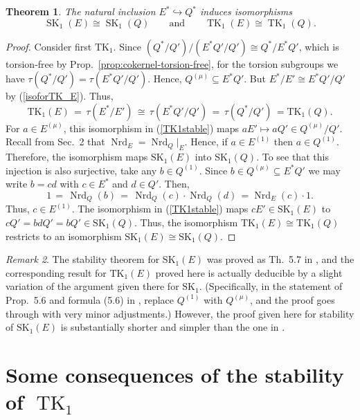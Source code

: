 \documentclass[11pt]{article}
\numberwithin{equation}{section}
\theoremstyle{plain}
\newtheorem{theorem}{Theorem}[section]
\theoremstyle{remark}
\newtheorem{remark}[theorem]{Remark}
\newcommand{\opn}{\operatorname}
\newcommand{\SK}{\opn{SK_1}}
\newcommand{\TK}{\opn{TK_1}}
\newcommand{\Emu}{E^{(\mu)}}
\newcommand{\Eone}{E^{(1)}}
\newcommand{\Nrd}{\opn{Nrd}}
\begin{document}
\begin{theorem}
\label{thm:stability-sk1-tk1}
\textit{The natural inclusion $E^*\hookrightarrow Q^*$ induces isomorphisms}
$$
        \operatorname{SK}_1(E)\cong \operatorname{SK}_1(Q)
        \qquad\text{and}\qquad
        \operatorname{TK}_1(E)\cong \operatorname{TK}_1(Q).
$$

\end{theorem}
\begin{proof}
Consider first $\TK$.  Since $(Q^*/Q') \big/ (E^*Q'/Q') \cong Q^*/E^*Q'$, which is 
torsion-free by Prop.~\ref{prop:cokernel-torsion-free}, for the torsion subgroups we have 
$\tau(Q^*/Q') = \tau(E^*Q'/Q')$.
Hence, $Q^{(\mu)} \subseteq E^*Q'$.
But $E^*/E' \cong E^*Q'/Q'$ by (\ref{isoforTK_E}).  Thus,
\begin{equation}
\label{TK1stable}
\TK(E) \, = \, \tau(E^*/E') \, \cong \, \tau(E^*Q'/Q') \, = \,\tau(Q^*/Q') \, = \TK(Q).
\end{equation}
For $a\in \Emu$, this isomorphism in (\ref{TK1stable}) maps $aE' \mapsto aQ'\in Q^{(\mu)}/Q'$.
Recall from Sec.~2 that $\Nrd_E =  \Nrd_Q|_E$.  Hence, if $a\in \Eone$ then $a\in Q^{(1)}$.  Therefore,
the isomorphism maps $\SK(E)$ into $\SK(Q)$.  To see that this injection is also surjective, take any 
$b\in Q^{(1)}$.  Since $b \in Q^{(\mu)} \subseteq E^*Q'$ we may write $b = cd$  with $c \in E^*$ and 
$d\in Q'$.  Then, 
$$
1 \, = \,\Nrd_Q(b)\, =\,  \Nrd_Q(c) \cdot \Nrd_Q(d) \, = \Nrd_E(c) \cdot 1.
$$
Thus, $c\in \Eone$.  The isomorphism in (\ref{TK1stable}) maps $cE' \in \SK(E)$ to 
$cQ' = bdQ' = bQ' \in \SK(Q)$.  Thus, the isomorphism $\TK(E) \cong \TK(Q)$ restricts
to an isomorphism $\SK(E) \cong \SK(Q)$.
\end{proof}

\begin{remark}
\label{other-stability-proof}
The stability theorem for $\SK (E)$ was proved as Th.~5.7 in  \cite{hazrat-wadsworth-2011}, and the 
corresponding result for $\TK (E)$ proved here is actually deducible by a slight variation of the 
argument given there for $\SK$.
(Specifically, in the statement of Prop.~5.6 and formula (5.6) in \cite{hazrat-wadsworth-2011}, 
replace $Q^{(1)}$ with $Q^{(\mu)}$, and the proof goes through with very minor adjustments.)
However, the proof given here for stability of $\SK (E)$ is substantially shorter and simpler than 
the one in \cite{hazrat-wadsworth-2011}.
\end{remark}

\section{Some consequences of the stability of $\operatorname{TK}_1$}\label{sec:stability-consequences}
\end{document}
